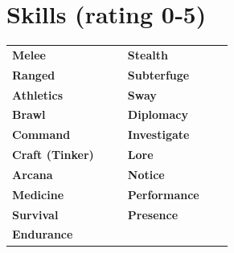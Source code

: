 \documentclass[paper=a4,landscape,12pt]{article}
\begin{document}
\section*{Skills (rating 0‑5)}
\noindent\begin{tabularx}{\linewidth}{@{} L{4.5cm} C{1.2cm} C{1.2cm} L{4.5cm} C{1.2cm} C{1.2cm} @{}}
\textbf{Melee}        & \underline{\hspace{1cm}} &  & \textbf{Stealth}     & \underline{\hspace{1cm}} &   \\
\textbf{Ranged}       & \underline{\hspace{1cm}} &  & \textbf{Subterfuge} & \underline{\hspace{1cm}} &   \\
\textbf{Athletics}    & \underline{\hspace{1cm}} &  & \textbf{Sway}       & \underline{\hspace{1cm}} &   \\
\textbf{Brawl}        & \underline{\hspace{1cm}} &  & \textbf{Diplomacy}  & \underline{\hspace{1cm}} &   \\
\textbf{Command}      & \underline{\hspace{1cm}} &  & \textbf{Investigate}& \underline{\hspace{1cm}} &   \\
\textbf{Craft (Tinker)}& \underline{\hspace{1cm}} &  & \textbf{Lore}       & \underline{\hspace{1cm}} &   \\
\textbf{Arcana}       & \underline{\hspace{1cm}} &  & \textbf{Notice}     & \underline{\hspace{1cm}} &   \\
\textbf{Medicine}      & \underline{\hspace{1cm}} &  & \textbf{Performance}& \underline{\hspace{1cm}} &   \\
\textbf{Survival}     & \underline{\hspace{1cm}} &  & \textbf{Presence}   & \underline{\hspace{1cm}} &   \\
\textbf{Endurance}    & \underline{\hspace{1cm}} &  &                     &                           &   \\
\end{tabularx}
\vspace{0.5cm}
\end{document}

